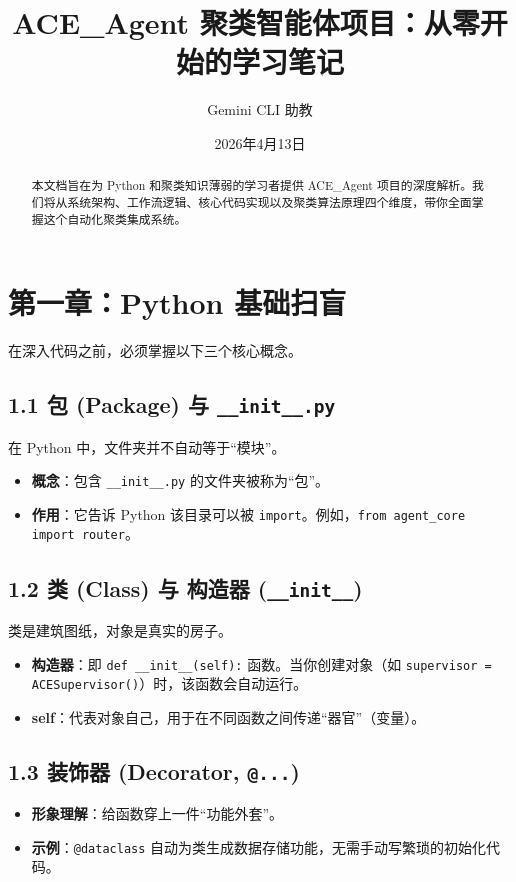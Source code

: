 \documentclass[11pt,a4paper]{article}
\title{\textbf{ACE\_Agent 聚类智能体项目：从零开始的学习笔记}}
\author{Gemini CLI 助教}
\date{2026年4月13日}
\begin{document}
\maketitle

\begin{abstract}
本文档旨在为 Python 和聚类知识薄弱的学习者提供 ACE\_Agent 项目的深度解析。我们将从系统架构、工作流逻辑、核心代码实现以及聚类算法原理四个维度，带你全面掌握这个自动化聚类集成系统。
\end{abstract}

\tableofcontents

\newpage

\section{第一章：Python 基础扫盲}

在深入代码之前，必须掌握以下三个核心概念。

\subsection{1.1 包 (Package) 与 \texttt{\_\_init\_\_.py}}
在 Python 中，文件夹并不自动等于“模块”。
\begin{itemize}
    \item \textbf{概念}：包含 \texttt{\_\_init\_\_.py} 的文件夹被称为“包”。
    \item \textbf{作用}：它告诉 Python 该目录可以被 \texttt{import}。例如，\texttt{from agent\_core import router}。
\end{itemize}

\subsection{1.2 类 (Class) 与 构造器 (\texttt{\_\_init\_\_})}
类是建筑图纸，对象是真实的房子。
\begin{itemize}
    \item \textbf{构造器}：即 \texttt{def \_\_init\_\_(self):} 函数。当你创建对象（如 \texttt{supervisor = ACESupervisor()}）时，该函数会自动运行。
    \item \textbf{self}：代表对象自己，用于在不同函数之间传递“器官”（变量）。
\end{itemize}

\subsection{1.3 装饰器 (Decorator, \texttt{@...})}
\begin{itemize}
    \item \textbf{形象理解}：给函数穿上一件“功能外套”。
    \item \textbf{示例}：\texttt{@dataclass} 自动为类生成数据存储功能，无需手动写繁琐的初始化代码。
\end{itemize}
\end{document}
